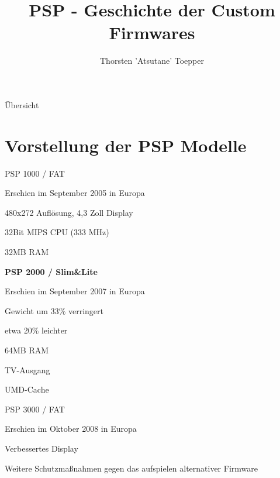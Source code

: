 \documentclass[mode=print,paper=screen,style=jefka]{powerdot}
\author{Thorsten 'Atsutane' Toepper}
\title{PSP - Geschichte der Custom Firmwares}
\newcommand{\Anf}[1]{\glqq #1\grqq}
\begin{document}
\maketitle
\begin{slide}{Übersicht}
  \tableofcontents[content=sections]
\end{slide}


\section{Vorstellung der PSP Modelle}
\begin{slide}{PSP 1000 / FAT}
	\begin{list}{-}{}
		\item{Erschien im September 2005 in Europa}
		\item{480x272 Auflösung, 4,3 Zoll Display}
		\item{32Bit MIPS CPU (333 MHz)}
		\item{32MB RAM}
	\end{list}

	\begin{LARGE}\textbf{PSP 2000 / Slim\&Lite}\end{LARGE}
	\begin{list}{-}{}
		\item{Erschien im September 2007 in Europa}
		\item{Gewicht um 33\% verringert}
		\item{etwa 20\% leichter}
		\item{64MB RAM}
		\item{TV-Ausgang}
		\item{UMD-Cache}
	\end{list}
\end{slide}

\begin{slide}{PSP 3000 / FAT}
	\begin{list}{-}{}
		\item{Erschien im Oktober 2008 in Europa}
		\item{\Anf{Verbessertes} Display}
		\item{Weitere Schutzmaßnahmen gegen das aufspielen alternativer Firmware}
	\end{list}
\end{slide}
\end{document}
